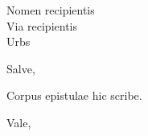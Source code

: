 \documentclass{letter}
\begin{document}
\begin{letter}{Nomen recipientis \\ Via recipientis \\ Urbs}
\opening{Salve,}

Corpus epistulae hic scribe.

\closing{Vale,}

\end{letter}
\end{document}
